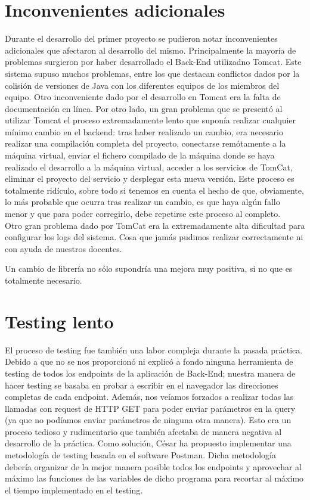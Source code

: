\documentclass[12pt]{report}
\begin{document}
\section{Inconvenientes adicionales} %
Durante el desarrollo del primer proyecto se pudieron notar inconvenientes adicionales que afectaron al desarrollo del mismo.
Principalmente la mayoría de problemas surgieron por haber desarrollado el Back-End utilizadno Tomcat.
Este sistema supuso muchos problemas, entre los que destacan conflictos dados por la colisión de versiones de Java con los diferentes equipos de los miembros del equipo.
Otro inconveniente dado por el desarrollo en Tomcat era la falta de documentación en línea.
Por otro lado, un gran problema que se presentó al utilizar Tomcat el proceso extremadamente lento que suponía realizar cualquier mínimo cambio en el backend: tras haber realizado un cambio, era necesario realizar una compilación completa del proyecto, conectarse remótamente a la máquina virtual, enviar el fichero compilado de la máquina donde se haya realizado el desarrollo a la máquina virtual, acceder a los servicios de TomCat, eliminar el proyecto del servicio y desplegar esta nueva versión. Este proceso es totalmente ridículo, sobre todo si tenemos en cuenta el hecho de que, obviamente, lo más probable que ocurra tras realizar un cambio, es que haya algún fallo menor y que para poder corregirlo, debe repetirse este proceso al completo.\\
Otro gran problema dado por TomCat era la extremadamente alta dificultad para configurar los logs del sistema. Cosa que jamás pudimos realizar correctamente ni con ayuda de nuestros docentes.

Un cambio de librería no sólo supondría una mejora muy positiva, si no que es totalmente necesario.
\section{Testing lento}
El proceso de testing fue también una labor compleja durante la pasada práctica. Debido a que no se nos proporcionó ni explicó a fondo ninguna herramienta de testing de todos los endpoints de la aplicación de Back-End; nuestra manera de hacer testing se basaba en probar a escribir en el navegador las direcciones completas de cada endpoint. Además, nos veíamos forzados a realizar todas las llamadas con request de HTTP GET para poder enviar parámetros en la query (ya que no podíamos enviar parámetros de ninguna otra manera). Esto era un proceso tedioso y rudimentario que también afectaba de manera negativa al desarrollo de la práctica.
Como solución, César ha propuesto implementar una metodología de testing basada en el software Postman. Dicha metodología debería organizar de la mejor manera posible todos los endpoints y aprovechar al máximo las funciones de las variables de dicho programa para recortar al máximo el tiempo implementado en el testing.
\end{document}
